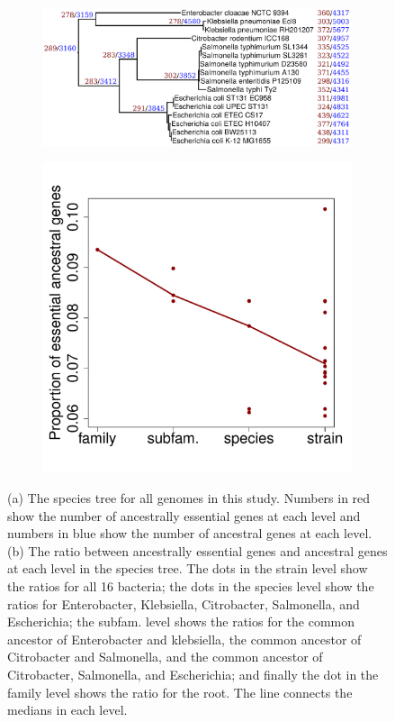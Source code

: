 \documentclass[12pt,letterpaper]{article}
\begin{document}
\begin{figure}
\captionsetup[subfigure]{justification=centering}
\begin{subfigure}{.6\textwidth}
  \centering
  \includegraphics[scale=0.12]{phylosift-aa-raxmlbootstrap-annotated.pdf}
  \caption{}
  \label{fig:tree}
\end{subfigure}
\begin{subfigure}{.4\textwidth}
  \centering
  \includegraphics[scale=0.4]{fitch.pdf}
  \caption{}
  \label{fig:fitch}
\end{subfigure}
\caption{(a) The species tree for all genomes in this study. Numbers in red show the number of ancestrally essential genes at each level and numbers in blue show the number of ancestral genes at each level. (b) The ratio between ancestrally essential genes and ancestral genes at each level in the species tree. The dots in the strain level show the ratios for all 16 bacteria; the dots in the species level show the ratios for Enterobacter, Klebsiella, Citrobacter, Salmonella, and Escherichia; the subfam. level shows the ratios for the common ancestor of Enterobacter and klebsiella, the common ancestor of Citrobacter and Salmonella, and the common ancestor of Citrobacter, Salmonella, and Escherichia; and finally the dot in the family level shows the ratio for the root. The line connects the medians in each level.}
\label{fig:essentiality-phylogeny}
\end{figure}
\end{document}
